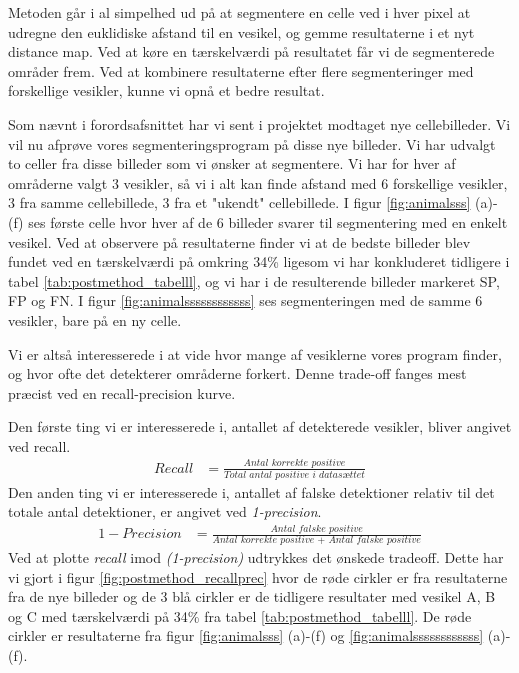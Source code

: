 Metoden går i al simpelhed ud på at segmentere en celle ved i hver pixel at udregne den euklidiske afstand til en vesikel, og gemme resultaterne i et nyt distance map. Ved at køre en tærskelværdi på resultatet får vi de segmenterede områder frem. Ved at kombinere resultaterne efter flere segmenteringer med forskellige vesikler, kunne vi opnå et bedre resultat. 

Som nævnt i forordsafsnittet har vi sent i projektet modtaget nye cellebilleder. Vi vil nu afprøve vores segmenteringsprogram på disse nye billeder. Vi har udvalgt to celler fra disse billeder som vi ønsker at segmentere. Vi har for hver af områderne valgt 3 vesikler, så vi i alt kan finde afstand med 6 forskellige vesikler, 3 fra samme cellebillede, 3 fra et "ukendt" cellebillede. I figur \ref{fig:animalsss} (a)-(f) ses første celle hvor hver af de 6 billeder svarer til segmentering med en enkelt vesikel. Ved at observere på resultaterne finder vi at de bedste billeder blev fundet ved en tærskelværdi på omkring 34\% ligesom vi har konkluderet tidligere i tabel \ref{tab:postmethod_tabelll}, og vi har i de resulterende billeder markeret SP, FP og FN. I figur \ref{fig:animalssssssssssss} ses segmenteringen med de samme 6 vesikler, bare på en ny celle.

Vi er altså interesserede i at vide hvor mange af vesiklerne vores program finder, og hvor ofte det detekterer områderne forkert. Denne trade-off fanges mest præcist ved en recall-precision kurve.

Den første ting vi er interesserede i, antallet af detekterede vesikler, bliver angivet ved recall. 
\begin{align}
	Recall &= \frac{\textit{Antal korrekte positive}}{\textit{Total antal positive i datasættet}}
\end{align}
Den anden ting vi er interesserede i, antallet af falske detektioner relativ til det totale antal detektioner, er angivet ved \emph{1-precision}.
\begin{align}
	1-Precision &= \frac{\textit{Antal falske positive}}{\textit{Antal korrekte positive + Antal falske positive}}
\end{align}
Ved at plotte \emph{recall} imod \emph{(1-precision)} udtrykkes det ønskede tradeoff. Dette har vi gjort i figur \ref{fig:postmethod_recallprec} hvor de røde cirkler er fra resultaterne fra de nye billeder og de 3 blå cirkler er de tidligere resultater med vesikel A, B og C med tærskelværdi på 34\% fra tabel \ref{tab:postmethod_tabelll}. De røde cirkler er resultaterne fra figur \ref{fig:animalsss} (a)-(f) og \ref{fig:animalssssssssssss} (a)-(f). 

